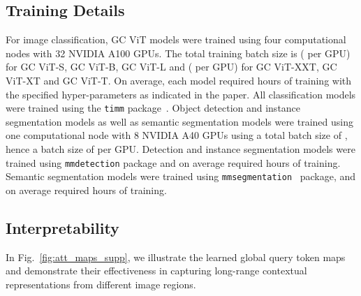\documentclass{article}
\theoremstyle{plain}
\theoremstyle{definition}
\theoremstyle{remark}
\begin{document}
\setlength{\tabcolsep}{4pt}
\begin{table}[h]
\centering
{}
    \caption{Ablation study on the effect of EMA and batch size on GC ViT-T ImageNet Top-1 accuracy.}
    \label{tab:ema}
\end{table}

\subsection{Training Details}
For image classification, GC ViT models were trained using four computational nodes with 32 NVIDIA A100 GPUs. The total training batch size is  ( per GPU) for GC ViT-S, GC ViT-B, GC ViT-L and  ( per GPU) for GC ViT-XXT, GC ViT-XT and GC ViT-T. On average, each model required  hours of training with the specified hyper-parameters as indicated in the paper. All classification models were trained using the \verb|timm| package~\citep{rw2019timm}. Object detection and instance segmentation models as well as semantic segmentation models were trained using one computational node with 8 NVIDIA A40 GPUs using a total batch size of , hence a batch size of  per GPU. Detection and instance segmentation models were trained using \verb|mmdetection| \citep{chen2019mmdetection} package and on average required  hours of training.  Semantic segmentation models were trained using \verb|mmsegmentation|~\citep{mmseg2020} package, and on average required  hours of training.





\subsection{Interpretability}
In Fig.~\ref{fig:att_maps_supp}, we illustrate the learned global query token maps and demonstrate their effectiveness in capturing long-range contextual representations from different image regions. 
\end{document}
